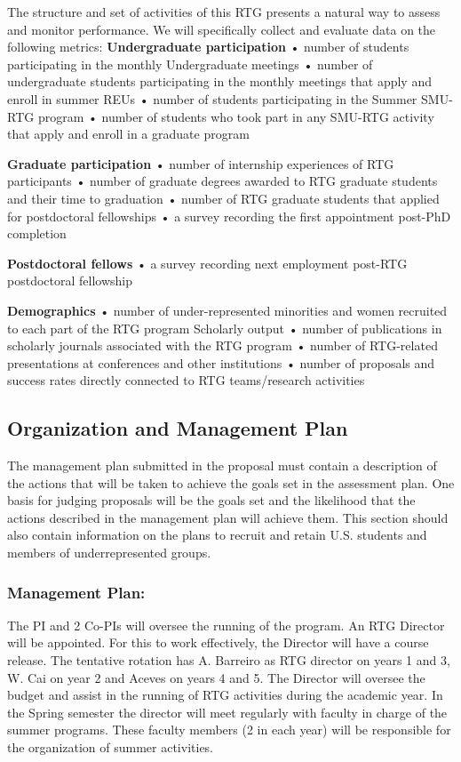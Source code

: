 \documentclass[11pt]{article}
\begin{document}
The structure and set of activities of this RTG presents a natural way to assess and monitor performance.
We will specifically collect and evaluate data on the following metrics:
\textbf{Undergraduate participation}
• number of students participating in the monthly Undergraduate meetings
• number of undergraduate students participating in the monthly meetings that apply and enroll in summer
REUs
• number of students participating in the Summer SMU-RTG program
• number of students who took part in any SMU-RTG activity that apply and enroll in a graduate program

\textbf{Graduate participation}
• number of internship experiences of RTG participants
• number of graduate degrees awarded to RTG graduate students and their time to graduation
• number of RTG graduate students that applied for postdoctoral fellowships
• a survey recording the first appointment post-PhD completion

\textbf{Postdoctoral fellows}
• a survey recording next employment post-RTG postdoctoral fellowship

\textbf{Demographics}
• number of under-represented minorities and women recruited to each part of the RTG program
Scholarly output
• number of publications in scholarly journals associated with the RTG program
• number of RTG-related presentations at conferences and other institutions
• number of proposals and success rates directly connected to RTG teams/research activities









\subsection{Organization and Management Plan }
 
The management plan submitted in the proposal must contain a description of the actions that will be taken to achieve the goals set in the assessment plan. One basis for judging proposals will be the goals set and the likelihood that the actions described in the management plan will achieve them. This section should also contain information on the plans to recruit and retain U.S. students and members of underrepresented groups. 
 
\subsubsection{Management Plan:}
 The PI and 2 Co-PIs will oversee the running of the program. An RTG Director will be appointed. For
this to work effectively, the Director will have a course release. The tentative rotation has A. Barreiro as
RTG director on years 1 and 3, W. Cai on year 2 and Aceves on years 4 and 5. The Director will oversee
the budget and assist in the running of RTG activities during the academic year. In the Spring semester
the director will meet regularly with faculty in charge of the summer programs. These faculty members
(2 in each year) will be responsible for the organization of summer activities.
\end{document}
